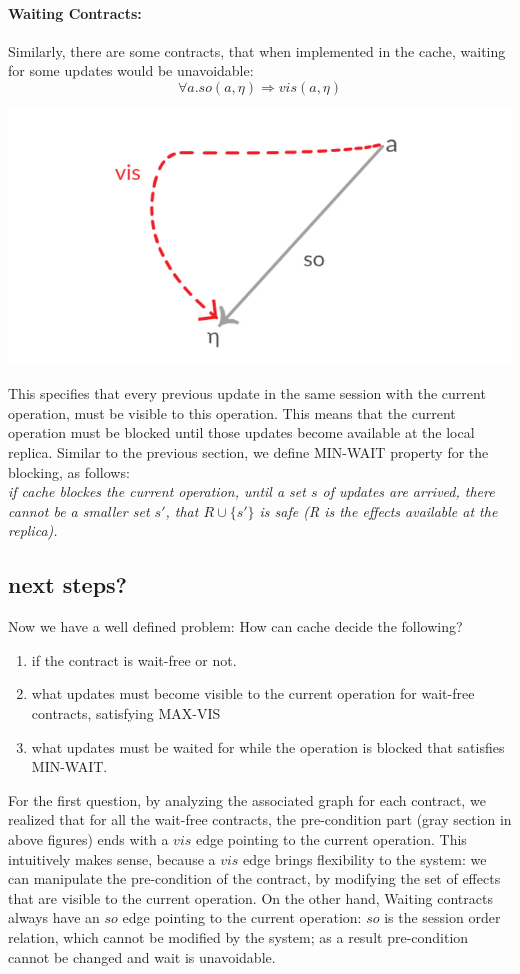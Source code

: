 \documentclass[runningheads]{llncs}
\begin{document}
\paragraph{Waiting Contracts:}
Similarly, there are some contracts, that when implemented in the cache, waiting for some updates would be unavoidable:
\[\forall a. so(a,\eta) \Rightarrow vis(a,\eta)\]
\begin{center}
\includegraphics[scale=0.4]{c1.pdf}
\end{center}
This specifies that every previous update in the same session with the current operation, must be visible to this operation. This means that the current operation must be blocked until those updates become available at the local replica. Similar to the previous section, we define MIN-WAIT property for the blocking, as follows:
\\ \emph{if cache blockes the current operation, until a set $s$ of updates are arrived, there cannot be a smaller set $s'$, that $R\cup\{s'\}$ is safe (R is the effects available at the replica). }



\subsection{next steps?}
Now we have a well defined problem: How can cache decide the following?
\begin {enumerate}
\item if the contract is wait-free or not.
\item what updates must become visible to the current operation for wait-free contracts, satisfying MAX-VIS
\item what updates must be waited for while the operation is blocked that satisfies MIN-WAIT.
\end{enumerate}

For the first question, by analyzing the associated graph for each contract, we realized that for all the wait-free contracts, the pre-condition part (gray section in above figures) ends with a $vis$ edge pointing to the current operation. This intuitively makes sense, because a $vis$ edge brings flexibility to the system: we can manipulate the pre-condition of the contract, by modifying the set of effects that are visible to the current operation. On the other hand, Waiting contracts always have an $so$ edge pointing to the current operation: $so$ is the session order relation, which cannot be modified by the system; as a result pre-condition cannot be changed and wait is unavoidable. 
\end{document}
